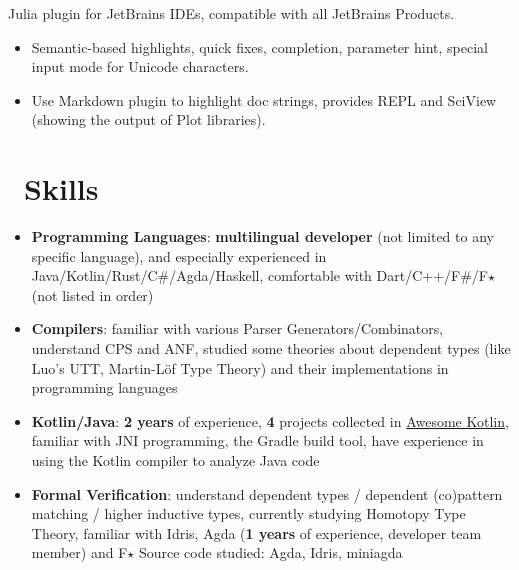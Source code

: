 \documentclass{resume}
\begin{document}
{
Julia plugin for JetBrains IDEs, compatible with all JetBrains Products.
\begin{itemize}
  \item Semantic-based highlights, quick fixes, completion, parameter hint, special input mode for Unicode characters.
  \item Use Markdown plugin to highlight doc strings, provides REPL and SciView (showing the output of Plot libraries).
\end{itemize}



\section{\faCogs\ Skills}
\begin{itemize}[parsep=0.25ex]
  \item \textbf{Programming Languages}:
    \textbf{multilingual developer} (not limited to any specific language),
    and especially experienced in Java/Kotlin/Rust/C\#/Agda/Haskell,
    comfortable with Dart/C++/F\#/F$\star$ (not listed in order)

  \item \textbf{Compilers}:
    familiar with various Parser Generators/Combinators,
    understand CPS and ANF, studied some
    theories about dependent types (like Luo's UTT, Martin-Löf Type Theory)
    and their implementations in programming languages

  \item \textbf{Kotlin/Java}:
    \textbf{2 years} of experience,
    \textbf{4} projects collected in
    \href{https://kotlin.link/?q=ice} {Awesome Kotlin},
    familiar with JNI programming, the Gradle build tool, have experience
    in using the Kotlin compiler to analyze Java code

  \item \textbf{Formal Verification}:
    understand dependent types / dependent (co)pattern matching /
    higher inductive types, currently studying Homotopy Type Theory,
    familiar with Idris, Agda (\textbf{1 years} of experience,
    developer team member) and F$\star$
    \subitem Source code studied: Agda, Idris, miniagda


\end{itemize}}
\end{document}
